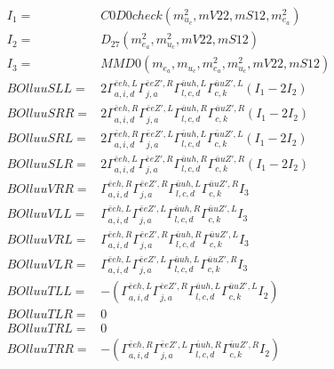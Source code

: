 \documentclass[A4,landscape]{article}
\begin{document}
\begin{align} 
I_1 = & C0D0check(m^2_{u_{{c}}}, mV22, mS12, m^2_{e_{{a}}}) \\ 
I_2 = & D_{27}(m^2_{e_{{a}}}, m^2_{u_{{c}}}, mV22, mS12) \\ 
I_3 = & MMD0(m_{e_{{a}}}, m_{u_{{c}}}, m^2_{e_{{a}}}, m^2_{u_{{c}}}, mV22, mS12) \\ 
  BOlluuSLL= & 2  \Gamma^{\bar{e}e h ,L}_{a, i, d} \Gamma^{\bar{e}e {Z'} ,R}_{j, a} \Gamma^{\bar{u}u h ,L}_{l, c, d} \Gamma^{\bar{u}u {Z'} ,L}_{c, k} (I_1 - 2 I_2) \\ 
  BOlluuSRR= & 2  \Gamma^{\bar{e}e h ,R}_{a, i, d} \Gamma^{\bar{e}e {Z'} ,L}_{j, a} \Gamma^{\bar{u}u h ,R}_{l, c, d} \Gamma^{\bar{u}u {Z'} ,R}_{c, k} (I_1 - 2 I_2) \\ 
  BOlluuSRL= & 2  \Gamma^{\bar{e}e h ,R}_{a, i, d} \Gamma^{\bar{e}e {Z'} ,L}_{j, a} \Gamma^{\bar{u}u h ,L}_{l, c, d} \Gamma^{\bar{u}u {Z'} ,L}_{c, k} (I_1 - 2 I_2) \\ 
  BOlluuSLR= & 2  \Gamma^{\bar{e}e h ,L}_{a, i, d} \Gamma^{\bar{e}e {Z'} ,R}_{j, a} \Gamma^{\bar{u}u h ,R}_{l, c, d} \Gamma^{\bar{u}u {Z'} ,R}_{c, k} (I_1 - 2 I_2) \\ 
  BOlluuVRR= &  \Gamma^{\bar{e}e h ,R}_{a, i, d} \Gamma^{\bar{e}e {Z'} ,R}_{j, a} \Gamma^{\bar{u}u h ,L}_{l, c, d} \Gamma^{\bar{u}u {Z'} ,R}_{c, k} I_3 \\ 
  BOlluuVLL= &  \Gamma^{\bar{e}e h ,L}_{a, i, d} \Gamma^{\bar{e}e {Z'} ,L}_{j, a} \Gamma^{\bar{u}u h ,R}_{l, c, d} \Gamma^{\bar{u}u {Z'} ,L}_{c, k} I_3 \\ 
  BOlluuVRL= &  \Gamma^{\bar{e}e h ,R}_{a, i, d} \Gamma^{\bar{e}e {Z'} ,R}_{j, a} \Gamma^{\bar{u}u h ,R}_{l, c, d} \Gamma^{\bar{u}u {Z'} ,L}_{c, k} I_3 \\ 
  BOlluuVLR= &  \Gamma^{\bar{e}e h ,L}_{a, i, d} \Gamma^{\bar{e}e {Z'} ,L}_{j, a} \Gamma^{\bar{u}u h ,L}_{l, c, d} \Gamma^{\bar{u}u {Z'} ,R}_{c, k} I_3 \\ 
  BOlluuTLL= & -( \Gamma^{\bar{e}e h ,L}_{a, i, d} \Gamma^{\bar{e}e {Z'} ,R}_{j, a} \Gamma^{\bar{u}u h ,L}_{l, c, d} \Gamma^{\bar{u}u {Z'} ,L}_{c, k} I_2) \\ 
  BOlluuTLR= & 0 \\ 
  BOlluuTRL= & 0 \\ 
  BOlluuTRR= & -( \Gamma^{\bar{e}e h ,R}_{a, i, d} \Gamma^{\bar{e}e {Z'} ,L}_{j, a} \Gamma^{\bar{u}u h ,R}_{l, c, d} \Gamma^{\bar{u}u {Z'} ,R}_{c, k} I_2) \\ 
\end{align} 
\end{document}
